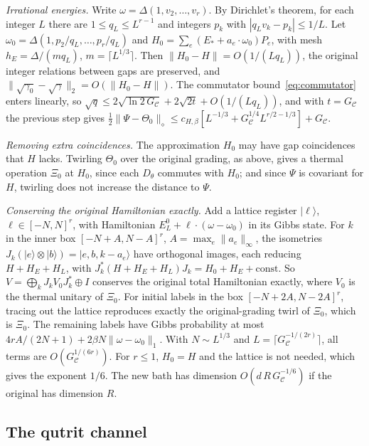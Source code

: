 \documentclass[11pt]{article}
\theoremstyle{definition}
\theoremstyle{remark}
\newcommand{\Dil}{\mathcal C}
\begin{document}
\emph{Irrational energies.} Write $\omega=\Delta(1,v_2,\dots,v_r)$. By Dirichlet's theorem, for each integer $L$ there are $1\le q_L\le L^{r-1}$ and integers $p_k$ with $|q_Lv_k-p_k|\le1/L$. Let $\omega_0=\Delta(1,p_2/q_L,\dots,p_r/q_L)$ and $H_0=\sum_e(E_*+a_e\cdot\omega_0)P_e$, with mesh $h_E=\Delta/(mq_L)$, $m=\lceil L^{1/3}\rceil$. Then $\|H_0-H\|=O(1/(Lq_L))$, the original integer relations between gaps are preserved, and $\|\sqrt{\gamma_0}-\sqrt\gamma\|_2=O(\|H_0-H\|)$. The commutator bound~\eqref{eq:commutator} enters linearly, so $\sqrt q\le2\sqrt{\ln2\,G_{\Dil}}+2\sqrt{2t}+O(1/(Lq_L))$, and with $t=G_{\Dil}$ the previous step gives $\tfrac12\|\Psi-\Theta_0\|_\diamond\le c_{H,\beta}[L^{-1/3}+G_{\Dil}^{1/4}L^{r/2-1/3}]+G_{\Dil}$.

\emph{Removing extra coincidences.} The approximation $H_0$ may have gap coincidences that $H$ lacks. Twirling $\Theta_0$ over the original grading, as above, gives a thermal operation $\Xi_0$ at $H_0$, since each $D_\theta$ commutes with $H_0$; and since $\Psi$ is covariant for $H$, twirling does not increase the distance to $\Psi$.

\emph{Conserving the original Hamiltonian exactly.} Add a lattice register $|\ell\rangle$, $\ell\in[-N,N]^r$, with Hamiltonian $E_L^0+\ell\cdot(\omega-\omega_0)$ in its Gibbs state. For $k$ in the inner box $[-N+A,N-A]^r$, $A=\max_e\|a_e\|_\infty$, the isometries $J_k(|e\rangle\otimes|b\rangle)=|e,b,k-a_e\rangle$ have orthogonal images, each reducing $H+H_E+H_L$, with $J_k^*(H+H_E+H_L)J_k=H_0+H_E+\text{const}$. So $V=\bigoplus_kJ_kV_0J_k^*\oplus I$ conserves the original total Hamiltonian exactly, where $V_0$ is the thermal unitary of $\Xi_0$. For initial labels in the box $[-N+2A,N-2A]^r$, tracing out the lattice reproduces exactly the original-grading twirl of $\Xi_0$, which is $\Xi_0$. The remaining labels have Gibbs probability at most $4rA/(2N+1)+2\beta N\|\omega-\omega_0\|_1$. With $N\sim L^{1/3}$ and $L=\lceil G_{\Dil}^{-1/(2r)}\rceil$, all terms are $O(G_{\Dil}^{1/(6r)})$. For $r\le1$, $H_0=H$ and the lattice is not needed, which gives the exponent $1/6$. The new bath has dimension $O(d\,R\,G_{\Dil}^{-1/6})$ if the original has dimension $R$.

\subsection{The qutrit channel}
\end{document}

